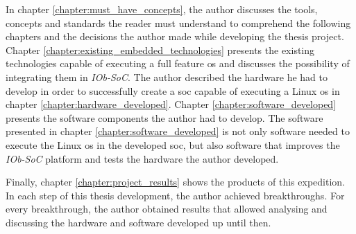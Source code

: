 In chapter \ref{chapter:must_have_concepts}, the author discusses the tools, concepts and standards the reader must understand to comprehend the following chapters and the decisions the author made while developing the thesis project. Chapter \ref{chapter:existing_embedded_technologies} presents the existing technologies capable of executing a full feature \acrlong{os} and discusses the possibility of integrating them in \textit{IOb-SoC}. The author described the hardware he had to develop in order to successfully create a \acrshort{soc} capable of executing a Linux \acrshort{os} in chapter \ref{chapter:hardware_developed}. Chapter \ref{chapter:software_developed} presents the software components the author had to develop. The software presented in chapter \ref{chapter:software_developed} is not only software needed to execute the Linux \acrshort{os} in the developed \acrshort{soc}, but also software that improves the \textit{IOb-SoC} platform and tests the hardware the author developed.

Finally, chapter \ref{chapter:project_results} shows the products of this expedition. In each step of this thesis development, the author achieved breakthroughs. For every breakthrough, the author obtained results that allowed analysing and discussing the hardware and software developed up until then.
